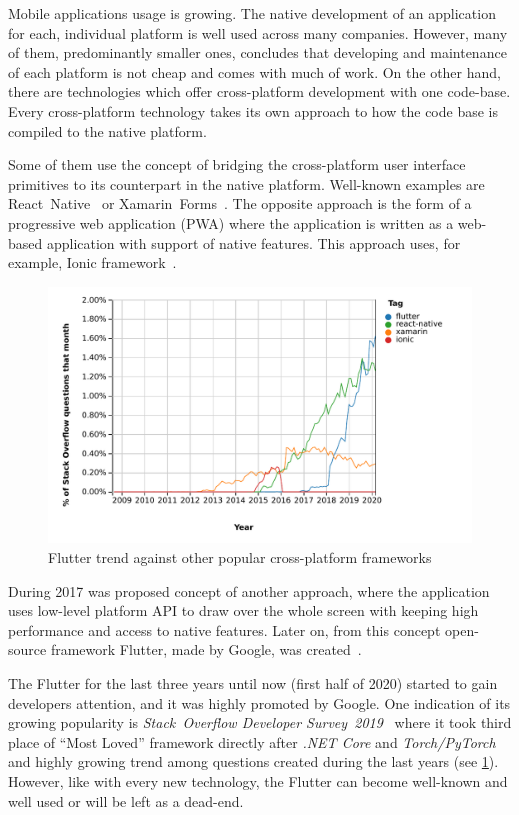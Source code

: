 \begin{introduction}
Mobile applications usage is growing. The native development of an application for each, individual platform is well used across many companies. However, many of them, predominantly smaller ones, concludes that developing and maintenance of each platform is not cheap and comes with much of work. On the other hand, there are technologies which offer cross-platform development with one code-base. Every cross-platform technology takes its own approach to how the code base is compiled to the native platform. 

Some of them use the concept of bridging the cross-platform user interface primitives to its counterpart in the native platform. Well-known examples are React~Native~\cite{react-native} or Xamarin~Forms~\cite{xamarin-forms}. The opposite approach is the form of a progressive web application (PWA) where the application is written as a web-based application with support of native features. This approach uses, for example, Ionic framework~\cite{ionic}. 

\begin{figure}[htp]
    \centering
    \includegraphics[width=\linewidth]{img/introduction/so-flutter-trend.pdf}
    \caption{Flutter trend against other popular cross-platform frameworks~\cite{so-flutter-trend}}
    \label{fig:so-flutter-trend}
\end{figure}

During 2017 was proposed concept of another approach, where the application uses low-level platform API to draw over the whole screen with keeping high performance and access to native features. Later on, from this concept open-source framework Flutter, made by Google,  was created~\cite{flutter}. 

The Flutter for the last three years until now (first half of 2020) started to gain developers attention, and it was highly promoted by Google. One indication of its growing popularity is \textit{Stack~Overflow Developer Survey~2019}~\cite{so-2019-survey} where it took third place of ``Most Loved'' framework directly after \textit{.NET Core} and \textit{Torch/PyTorch} and highly growing trend among questions created during the last years (see \cref{fig:so-flutter-trend}). However, like with every new technology, the Flutter can become well-known and well used or will be left as a dead-end. 


\end{introduction}
